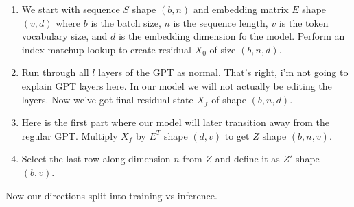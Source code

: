 \documentclass{article}
\begin{document}
\begin{enumerate}
    \item We start with sequence $S$ shape $(b,n)$ and embedding matrix $E$ shape $(v,d)$ where $b$ is the batch size, $n$ is the sequence length, $v$ is the token vocabulary size, and $d$ is the embedding dimension fo the model.
    Perform an index matchup lookup to create residual $X_0$ of size $(b,n,d)$.
    \item Run through all $l$ layers of the GPT as normal. 
    That's right, i'm not going to explain GPT layers here. 
    In our model we will not actually be editing the layers.
    Now we've got final residual state $X_f$ of shape $(b,n,d)$.
    \item Here is the first part where our model will later transition away from the regular GPT. Multiply $X_f$ by $E^T$ shape $(d,v)$ to get $Z$ shape $(b,n,v)$.
    \item Select the last row along dimension $n$ from $Z$ and define it as $Z'$ shape $(b,v)$.
\end{enumerate}

Now our directions split into training vs inference.
\end{document}
